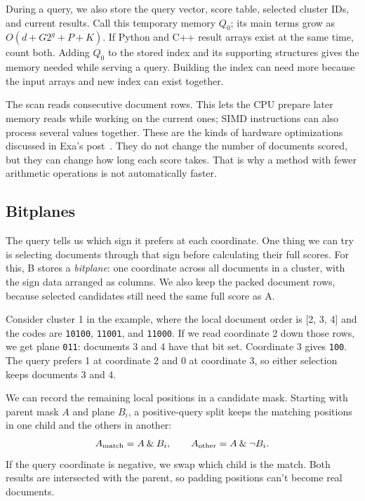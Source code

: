 During a query, we also store the query vector, score table, selected cluster IDs, and current
results. Call this temporary memory $Q_0$; its main terms grow as $O(d+G2^g+P+K)$. If Python
and C++ result arrays exist at the same time, count both. Adding $Q_0$ to the stored index
and its supporting structures gives the memory needed while serving a query. Building the
index can need more because the input arrays and new index can exist together.

The scan reads consecutive document rows. This lets the CPU prepare later memory reads while
working on the current ones; SIMD instructions can also process several values together.
These are the kinds of hardware optimizations discussed in Exa's post~\cite{exa}. They do not
change the number of documents scored, but they can change how long each score takes.
That is why a method with fewer arithmetic operations is not automatically faster.

\subsection{Bitplanes}
The query tells us which sign it prefers at each coordinate. One thing we can try is selecting
documents through that sign before calculating their full scores. For this, B stores a
\emph{bitplane}: one coordinate across all documents in a cluster, with the sign data arranged
as columns. We also keep the packed document rows, because selected candidates still need the
same full score as A.

Consider cluster 1 in the example, where the local document order is [2, 3, 4] and the codes
are \texttt{10100}, \texttt{11001}, and \texttt{11000}. If we read coordinate 2 down those
rows, we get plane \texttt{011}: documents 3 and 4 have that bit set. Coordinate 3 gives
\texttt{100}. The query prefers 1 at coordinate 2 and 0 at coordinate 3, so either selection
keeps documents 3 and 4.

We can record the remaining local positions in a candidate mask. Starting with parent mask
$A$ and plane $B_i$, a positive-query split keeps the matching positions in one child and the
others in another:
\[
A_{\rm match}=A\mathbin{\&}B_i,
\qquad A_{\rm other}=A\mathbin{\&}\neg B_i.
\]
If the query coordinate is negative, we swap which child is the match. Both results are
intersected with the parent, so padding positions can't become real documents.


